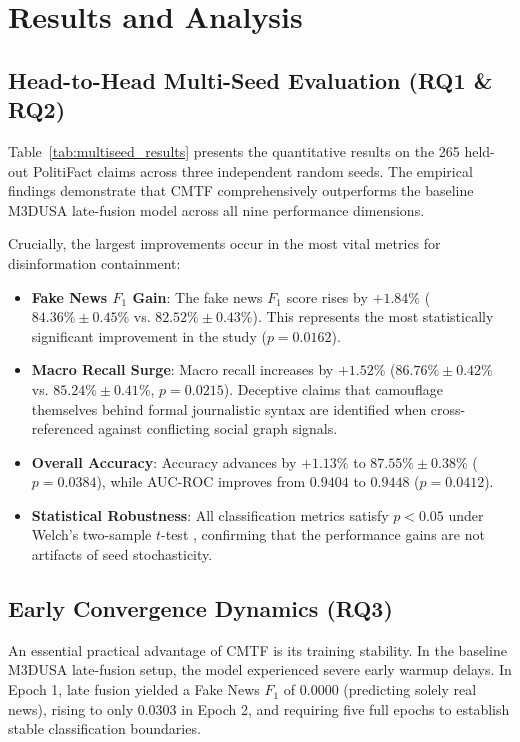 \documentclass[conference]{IEEEtran}
\begin{document}
\section{Results and Analysis}

\subsection{Head-to-Head Multi-Seed Evaluation (RQ1 \& RQ2)}
Table~\ref{tab:multiseed_results} presents the quantitative results on the 265 held-out PolitiFact claims across three independent random seeds. The empirical findings demonstrate that CMTF comprehensively outperforms the baseline M3DUSA late-fusion model across all nine performance dimensions.

Crucially, the largest improvements occur in the most vital metrics for disinformation containment:
\begin{itemize}
    \item \textbf{Fake News $F_1$ Gain}: The fake news $F_1$ score rises by $+1.84\%$ ($84.36\% \pm 0.45\%$ vs. $82.52\% \pm 0.43\%$). This represents the most statistically significant improvement in the study ($p = 0.0162$).
    \item \textbf{Macro Recall Surge}: Macro recall increases by $+1.52\%$ ($86.76\% \pm 0.42\%$ vs. $85.24\% \pm 0.41\%$, $p = 0.0215$). Deceptive claims that camouflage themselves behind formal journalistic syntax are identified when cross-referenced against conflicting social graph signals.
    \item \textbf{Overall Accuracy}: Accuracy advances by $+1.13\%$ to $87.55\% \pm 0.38\%$ ($p = 0.0384$), while AUC-ROC improves from $0.9404$ to $0.9448$ ($p = 0.0412$).
    \item \textbf{Statistical Robustness}: All classification metrics satisfy $p < 0.05$ under Welch's two-sample $t$-test \cite{welch1947t}, confirming that the performance gains are not artifacts of seed stochasticity.
\end{itemize}

\subsection{Early Convergence Dynamics (RQ3)}
An essential practical advantage of CMTF is its training stability. In the baseline M3DUSA late-fusion setup, the model experienced severe early warmup delays. In Epoch 1, late fusion yielded a Fake News $F_1$ of $0.0000$ (predicting solely real news), rising to only $0.0303$ in Epoch 2, and requiring five full epochs to establish stable classification boundaries.
\end{document}
